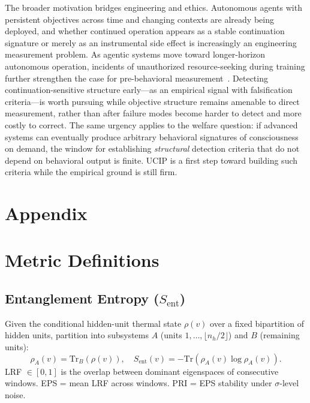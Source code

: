 \documentclass[11pt]{article}
\begin{document}
	The broader motivation bridges engineering and ethics. Autonomous
	agents with persistent objectives across time and changing contexts are already
	being deployed, and whether continued operation appears as a stable
	continuation signature or merely as an instrumental side effect is increasingly
	an engineering measurement problem. As agentic systems move toward
	longer-horizon autonomous operation, incidents of unauthorized resource-seeking
	during training further strengthen the case for pre-behavioral
	measurement~\cite{anthropic2026opus}. Detecting continuation-sensitive structure
	early---as an empirical signal with falsification criteria---is worth pursuing
	while objective structure remains amenable to direct measurement, rather than
	after failure modes become harder to detect and more costly to correct.
	The same urgency applies to the welfare question: if advanced systems can
	eventually produce arbitrary behavioral signatures of consciousness on
	demand, the window for establishing \emph{structural} detection criteria
	that do not depend on behavioral output is finite. UCIP is a first step
	toward building such criteria while the empirical ground is still firm.
	
	\newpage
	
	
	
	\newpage
	\appendix
	
	\section*{Appendix}
	
	\section{Metric Definitions}\label{app:metrics}
	
	\subsection{Entanglement Entropy (\texorpdfstring{$S_\mathrm{ent}$}{S ent})}
	
	Given the conditional hidden-unit thermal state $\rho(v)$ over a fixed
	bipartition of hidden units, partition into subsystems $A$ (units
	$1,\ldots,\lfloor n_h/2 \rfloor$) and $B$ (remaining units):
	\[
	\rho_A(v) = \mathrm{Tr}_B(\rho(v)), \quad
	S_\mathrm{ent}(v) = -\mathrm{Tr}(\rho_A(v) \log \rho_A(v)).
	\]
	LRF $\in [0,1]$ is the overlap between dominant eigenspaces of consecutive windows.
	EPS = mean LRF across windows. PRI = EPS stability under $\sigma$-level noise.
	
\end{document}
